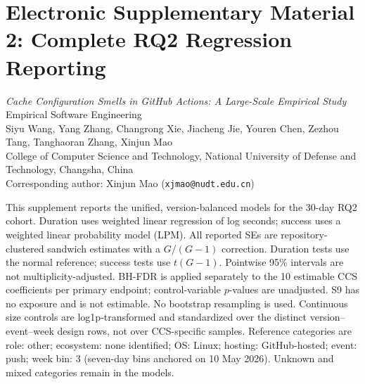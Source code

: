 \documentclass{article}
\begin{document}
\section*{Electronic Supplementary Material 2: Complete RQ2 Regression Reporting}
\noindent\textit{Cache Configuration Smells in GitHub Actions: A Large-Scale Empirical Study}\\
Empirical Software Engineering\\
Siyu Wang, Yang Zhang, Changrong Xie, Jiacheng Jie, Youren Chen, Zezhou Tang, Tanghaoran Zhang, Xinjun Mao\\
College of Computer Science and Technology, National University of Defense and Technology, Changsha, China\\
Corresponding author: Xinjun Mao (\texttt{xjmao@nudt.edu.cn})\par\medskip

This supplement reports the unified, version-balanced models for the 30-day RQ2 cohort. Duration uses weighted linear regression of log seconds; success uses a weighted linear probability model (LPM). All reported SEs are repository-clustered sandwich estimates with a $G/(G-1)$ correction. Duration tests use the normal reference; success tests use $t(G-1)$. Pointwise 95\% intervals are not multiplicity-adjusted. BH-FDR is applied separately to the 10 estimable CCS coefficients per primary endpoint; control-variable $p$-values are unadjusted. S9 has no exposure and is not estimable. No bootstrap resampling is used. Continuous size controls are log1p-transformed and standardized over the distinct version--event--week design rows, not over CCS-specific samples. Reference categories are role: other; ecosystem: none identified; OS: Linux; hosting: GitHub-hosted; event: push; week bin: 3 (seven-day bins anchored on 10 May 2026). Unknown and mixed categories remain in the models.
\end{document}
